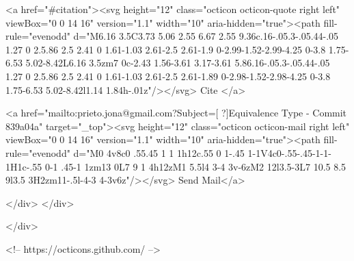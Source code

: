       <a  href="#citation"><svg height="12" class="octicon octicon-quote right left" viewBox="0 0 14 16" version="1.1" width="10" aria-hidden="true"><path fill-rule="evenodd" d="M6.16 3.5C3.73 5.06 2.55 6.67 2.55 9.36c.16-.05.3-.05.44-.05 1.27 0 2.5.86 2.5 2.41 0 1.61-1.03 2.61-2.5 2.61-1.9 0-2.99-1.52-2.99-4.25 0-3.8 1.75-6.53 5.02-8.42L6.16 3.5zm7 0c-2.43 1.56-3.61 3.17-3.61 5.86.16-.05.3-.05.44-.05 1.27 0 2.5.86 2.5 2.41 0 1.61-1.03 2.61-2.5 2.61-1.89 0-2.98-1.52-2.98-4.25 0-3.8 1.75-6.53 5.02-8.42l1.14 1.84h-.01z"/></svg> Cite
      </a>

      <a href="mailto:prieto.jona@gmail.com?Subject=[ ?]Equivalence Type - Commit 839a04a" target="_top"><svg height="12" class="octicon octicon-mail right left" viewBox="0 0 14 16" version="1.1" width="10" aria-hidden="true"><path fill-rule="evenodd" d="M0 4v8c0 .55.45 1 1 1h12c.55 0 1-.45 1-1V4c0-.55-.45-1-1-1H1c-.55 0-1 .45-1 1zm13 0L7 9 1 4h12zM1 5.5l4 3-4 3v-6zM2 12l3.5-3L7 10.5 8.5 9l3.5 3H2zm11-.5l-4-3 4-3v6z"/></svg> Send Mail</a>

    </div>
  </div>

</div>

<!-- https://octicons.github.com/ -->





